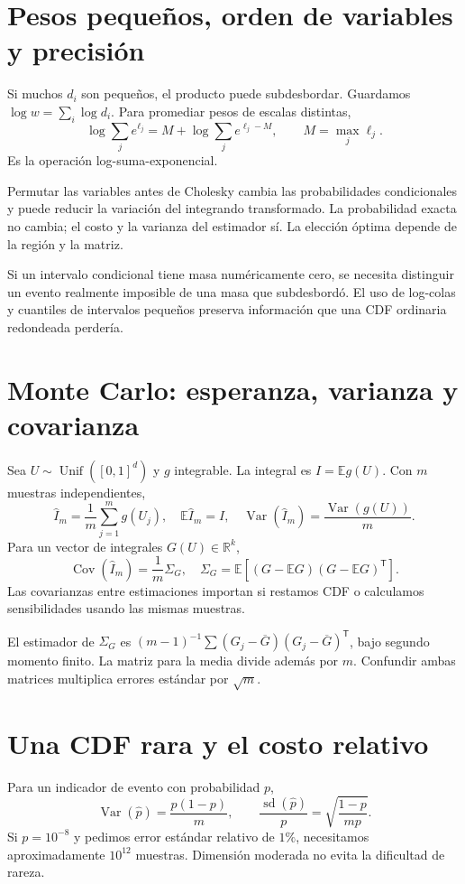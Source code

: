 \documentclass[11pt,a4paper]{article}
\newcommand{\R}{\mathbb R}
\newcommand{\E}{\mathbb E}
\newcommand{\T}{^{\mathsf T}}
\DeclareMathOperator{\Var}{Var}
\DeclareMathOperator{\Cov}{Cov}
\theoremstyle{definition}
\begin{document}
\section{Pesos pequeños, orden de variables y precisión}
Si muchos $d_i$ son pequeños, el producto puede subdesbordar. Guardamos
$\log w=\sum_i\log d_i$. Para promediar pesos de escalas distintas,
\[
\log\sum_j e^{\ell_j}
=M+\log\sum_j e^{\ell_j-M},\qquad M=\max_j\ell_j.
\]
Es la operación log-suma-exponencial.

Permutar las variables antes de Cholesky cambia las probabilidades condicionales y puede reducir la variación del integrando transformado. La probabilidad exacta no cambia; el costo y la varianza del estimador sí. La elección óptima depende de la región y la matriz.

Si un intervalo condicional tiene masa numéricamente cero, se necesita distinguir un evento realmente imposible de una masa que subdesbordó. El uso de log-colas y cuantiles de intervalos pequeños preserva información que una CDF ordinaria redondeada perdería.

\section{Monte Carlo: esperanza, varianza y covarianza}
Sea $U\sim\operatorname{Unif}([0,1]^d)$ y $g$ integrable. La integral es $I=\E g(U)$. Con $m$ muestras independientes,
\[
\widehat I_m=\frac1m\sum_{j=1}^mg(U_j),\quad
\E\widehat I_m=I,\quad
\Var(\widehat I_m)=\frac{\Var(g(U))}{m}.
\]
Para un vector de integrales $G(U)\in\R^k$,
\[
\Cov(\widehat I_m)=\frac1m\Sigma_G,\quad
\Sigma_G=\E[(G-\E G)(G-\E G)\T].
\]
Las covarianzas entre estimaciones importan si restamos CDF o calculamos sensibilidades usando las mismas muestras.

El estimador de $\Sigma_G$ es
$(m-1)^{-1}\sum(G_j-\overline G)(G_j-\overline G)\T$, bajo segundo momento finito. La matriz para la media divide además por $m$. Confundir ambas matrices multiplica errores estándar por $\sqrt m$.

\section{Una CDF rara y el costo relativo}
Para un indicador de evento con probabilidad $p$,
\[
\Var(\widehat p)=\frac{p(1-p)}m,\qquad
\frac{\operatorname{sd}(\widehat p)}p
=\sqrt{\frac{1-p}{mp}}.
\]
Si $p=10^{-8}$ y pedimos error estándar relativo de $1\%$, necesitamos aproximadamente $10^{12}$ muestras. Dimensión moderada no evita la dificultad de rareza.
\end{document}
